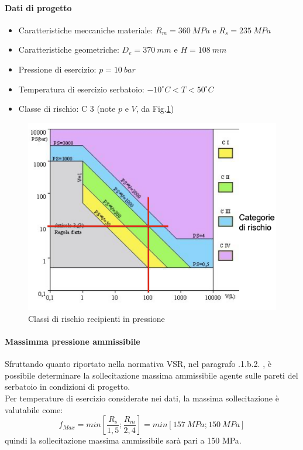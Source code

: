 \paragraph{Dati di progetto}
\begin{itemize}
    \item Caratteristiche meccaniche materiale: $R_m=360\ MPa$ e $R_s=235\ MPa$
    \item Caratteristiche geometriche: $D_e=370\ mm$ e $H=108\ mm$
    \item Pressione di esercizio: $p=10\ bar$
    \item Temperatura di esercizio serbatoio: $-10^{\circ}C<T<50^{\circ}C$
    \item Classe di rischio: C 3 (note $p$ e $V$, da Fig.\ref{fig:ClasseDiRischio})
\end{itemize}
\begin{figure}[h]
    \centering
    \includegraphics[scale=0.25]{Immagini/ClasseDiRischio.png}
    \caption{Classi di rischio recipienti in pressione}
    \label{fig:ClasseDiRischio}
\end{figure}
\paragraph{Massimma pressione ammissibile}
Sfruttando quanto riportato nella normativa VSR, nel paragrafo .1.b.2. , è possibile determinare la sollecitazione massima ammissibile agente sulle pareti del serbatoio in condizioni di progetto.\\
Per temperature di esercizio considerate nei dati, la massima sollecitazione è valutabile come:
\begin{equation}
    f_{Max}=min\left[\frac{R_s}{1,5};\frac{R_m}{2,4}\right]=min[157\ MPa;150\ MPa]
\end{equation}
quindi la sollecitazione massima ammissibile sarà pari a 150 MPa.
